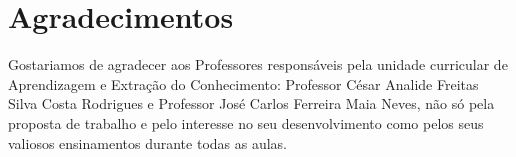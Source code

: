 \section*{Agradecimentos}\label{sec:Acknowledgments}

Gostariamos de agradecer aos Professores responsáveis pela unidade curricular de Aprendizagem e Extração do Conhecimento: Professor César Analide Freitas Silva Costa Rodrigues e Professor José Carlos Ferreira Maia Neves, não só pela proposta de trabalho e pelo interesse no seu desenvolvimento como pelos seus valiosos ensinamentos durante todas as aulas.